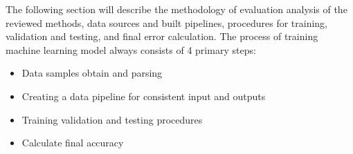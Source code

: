 The following section will describe the methodology of evaluation analysis of the reviewed methods, data sources and built pipelines, procedures for training, validation and testing, and final error calculation.
The process of training machine learning model always consists of 4 primary steps:
\begin{itemize}
    \item Data samples obtain and parsing\\
    \item Creating a data pipeline for consistent input and outputs\\
    \item Training validation and testing procedures\\
    \item Calculate final accuracy\\
\end{itemize}

